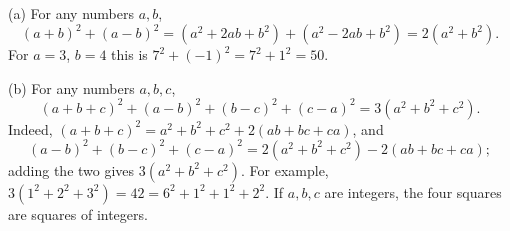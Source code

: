(a) For any numbers $a,b$,
\[
(a+b)^2+(a-b)^2=\left(a^2+2ab+b^2\right)+\left(a^2-2ab+b^2\right)=2\left(a^2+b^2\right).
\]
For $a=3$, $b=4$ this is $7^2+(-1)^2=7^2+1^2=50$.

(b) For any numbers $a,b,c$,
\[
(a+b+c)^2+(a-b)^2+(b-c)^2+(c-a)^2=3\left(a^2+b^2+c^2\right).
\]
Indeed, $(a+b+c)^2=a^2+b^2+c^2+2(ab+bc+ca)$, and
\[
(a-b)^2+(b-c)^2+(c-a)^2=2\left(a^2+b^2+c^2\right)-2(ab+bc+ca);
\]
adding the two gives $3\left(a^2+b^2+c^2\right)$. For example, $3\left(1^2+2^2+3^2\right)=42=6^2+1^2+1^2+2^2$. If $a,b,c$ are integers, the four squares are squares of integers.
